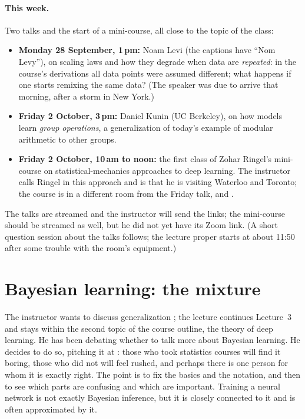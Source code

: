 \paragraph{This week.}
Two talks and the start of a mini-course, all close to the topic of the class:
\begin{itemize}
  \item \textbf{Monday 28 September, 1\,pm:} Noam Levi\flag{} (the captions have ``Nom Levy''), on scaling laws and how they degrade when data are \emph{repeated}: in the course's derivations all data points were assumed different; what happens if one starts remixing the same data? (The speaker was due to arrive that morning, after a storm in New York.)
  \item \textbf{Friday 2 October, 3\,pm:} Daniel Kunin (UC Berkeley), on how models learn \emph{group operations}, a generalization of today's example of modular arithmetic to other groups.
  \item \textbf{Friday 2 October, 10\,am to noon:} the first class of Zohar Ringel's mini-course on statistical-mechanics approaches to deep learning. The instructor calls Ringel  in this approach and is  that he is visiting Waterloo and Toronto; the course is in a different room from the Friday talk, and .
\end{itemize}
The talks are streamed and the instructor will send the links; the mini-course should be streamed as well, but he did not yet have its Zoom link. (A short question session about the talks follows; the lecture proper starts at about 11:50 after some trouble with the room's equipment.)

\section{Bayesian learning: the mixture}\label{sec:L5-bayes}
The instructor wants to discuss generalization ; the lecture continues Lecture~3 and stays within the second topic of the course outline, the theory of deep learning. He has been debating whether to talk more about Bayesian learning. He decides to do so, pitching it at : those who took statistics courses will find it boring, those who did not will feel rushed, and perhaps there is one person for whom it is exactly right. The point is to fix the basics and the notation, and then to see which parts are confusing and which are important. Training a neural network is not exactly Bayesian inference, but it is closely connected to it and is often approximated by it.

